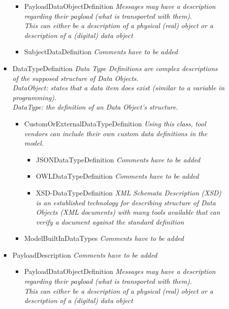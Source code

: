 \begin{itemize}
\begin{itemize}
\begin{itemize}
\begin{itemize}
			\item PayloadDataObjectDefinition \linebreak \textit{Messages may have a description regarding their payload (what is transported with them).\\This can either be a description of a physical (real) object or a description of a (digital) data object}
			\item SubjectDataDefinition \linebreak \textit{Comments have to be added}
		\end{itemize}
		\item DataTypeDefinition \linebreak \textit{Data Type Definitions are complex descriptions of the supposed structure of Data Objects. \\ DataObject: states that a data item does exist (similar to a variable in programming). \\DataType: the definition of an Data Object's structure.}
		\begin{itemize}
			\item CustomOrExternalDataTypeDefinition \linebreak \textit{Using this class, tool vendors can include their own custom data definitions in the model.}
			\begin{itemize}
					\item JSONDataTypeDefinition \linebreak \textit{Comments have to be added}
					\item OWLDataTypeDefinition \linebreak \textit{Comments have to be added}
					\item XSD-DataTypeDefinition \linebreak \textit{XML Schemata Description (XSD) is an established technology for describing structure of Data Objects (XML documents) with many tools available that can verify a document against the standard definition}
			\end{itemize}
			\item ModelBuiltInDataTypes \linebreak \textit{Comments have to be added}
		\end{itemize}
		\item PayloadDescription \linebreak \textit{Comments have to be added}
		\begin{itemize}
			\item PayloadDataObjectDefinition \linebreak \textit{Messages may have a description regarding their payload (what is transported with them).\\This can either be a description of a physical (real) object or a description of a (digital) data object}

\end{itemize}
\end{itemize}
\end{itemize}
\end{itemize}
